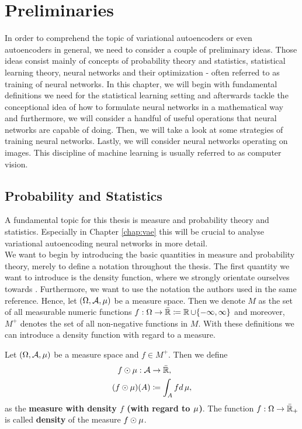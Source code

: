 \chapter{Preliminaries}\label{chap:preliminary}
In order to comprehend the topic of variational autoencoders or even autoencoders in general, we need to consider a couple of preliminary ideas. Those ideas consist mainly of concepts of probability theory and statistics, statistical learning theory, neural networks and their optimization - often referred to as training of neural networks. In this chapter, we will begin with fundamental definitions we need for the statistical learning setting and afterwards tackle the conceptional idea of how to formulate neural networks in a mathematical way and furthermore, we will consider a handful of useful operations that neural networks are capable of doing. Then, we will take a look at some strategies of training neural networks. Lastly, we will consider neural networks operating on images. This discipline of machine learning is usually referred to as computer vision.


\section{Probability and Statistics}\label{sec:preliminary_prob}

A fundamental topic for this thesis is measure and probability theory and statistics. Especially in Chapter \ref{chap:vae} this will be crucial to analyse variational autoencoding neural networks in more detail.\\
We want to begin by introducing the basic quantities in measure and probability theory, merely to define a notation throughout the thesis. The first quantity we want to introduce is the density function, where we strongly orientate ourselves towards \cite[Chapter~2 \& Chapter~3]{meintrup2006stochastik}. Furthermore, we want to use the notation the authors used in the same reference. Hence, let $(\Omega, \operatorname{\mathcal{A}}, \operatorname{\mu})$ be a measure space. Then we denote $M$ as the set of all measurable numeric functions $f:\Omega\to \bar{\operatorname{\mathbb{R}}}\coloneqq \operatorname{\mathbb{R}} \cup \{-\infty, \infty\}$ and moreover, $M^{+}$ denotes the set of all non-negative functions in $M$. With these definitions we can introduce a density function with regard to a measure.

\begin{definition}\label{def:density}
Let $(\Omega, \operatorname{\mathcal{A}}, \operatorname{\mu})$ be a measure space and $f\in M^{+}$. Then we define
\begin{align*}
f \odot \mu: \operatorname{\mathcal{A}} &\to \bar{\operatorname{\mathbb{R}}},\\
(f \odot \mu) (A) &\coloneqq \int_{A}fd\operatorname{\mu},
\end{align*}
as the \textbf{measure with density $f$ (with regard to $\operatorname{\mu}$)}. The function $f:\Omega \to \bar{\operatorname{\mathbb{R}}}_{+}$ is called \textbf{density} of the measure $f\odot \operatorname{\mu}$.
\end{definition}

